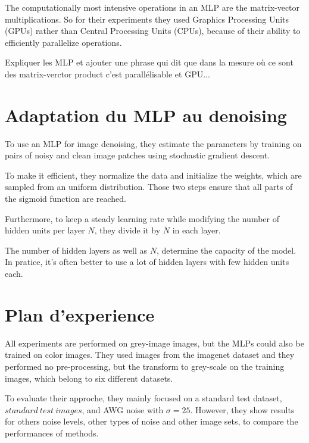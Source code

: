 \documentclass[10pt,a4paper]{article}
\newcommand{\svs}{\vspace{9pt}}
\begin{document}
\svs 

The computationally most intensive operations in an MLP are the matrix-vector multiplications. So for their experiments they used Graphics Processing Units (GPUs) rather than Central Processing Units (CPUs), because of their ability to efficiently parallelize operations.


\svs



Expliquer les MLP et ajouter une phrase qui dit que dans la mesure où ce sont des matrix-verctor product c'est parallélisable et GPU...




\section{Adaptation du MLP au denoising}


To use an MLP for image denoising, they estimate the parameters by training on pairs of noisy and clean image patches using stochastic gradient descent. 


\svs

To make it efficient, they normalize the data and initialize the weights, which are sampled from an uniform distribution. Those two steps ensure that all parts of the sigmoid function are reached.

\svs

Furthermore, to keep a steady learning rate while modifying the number of hidden units per layer $N$, they divide it by $N$ in each layer.

\svs

The number of hidden layers as well as $N$, determine the capacity of the model. In pratice, it's often better to use a lot of hidden layers with few hidden units each.

\svs

\section{Plan d'experience}

All experiments are performed on grey-image images, but the MLPs could also be trained on color images. They used images from the imagenet dataset and they performed no pre-processing, but the transform to grey-scale on the training images, which belong to six different datasets.

\svs 

To evaluate their approche, they mainly focused on a standard test dataset, $standard\ test\ images$, and AWG noise with $\sigma=25$. However, they show results for others noise levels, other types of noise and other image sets, to compare the performances of methods.




\printbibliography
\end{document}

